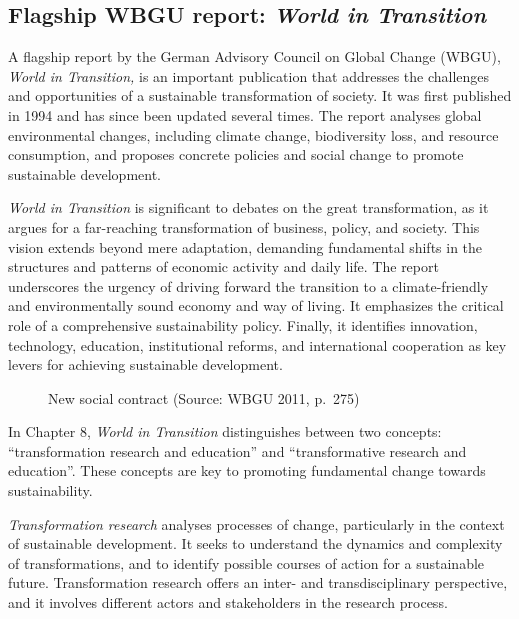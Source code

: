 \documentclass[
  a4paper,
  openany]{book}
\makeatletter
\newcommand*\pandocbounded[1]{%
  \sbox\pandoc@box{#1}%
  \Gscale@div\@tempa{\textheight}{\dimexpr\ht\pandoc@box+\dp\pandoc@box\relax}%
  \Gscale@div\@tempb{\linewidth}{\wd\pandoc@box}%
  \ifdim\@tempb\p@<\@tempa\p@\let\@tempa\@tempb\fi%
  \ifdim\@tempa\p@<\p@\scalebox{\@tempa}{\usebox\pandoc@box}%
  \else\usebox{\pandoc@box}%
  \fi%
}
\makeatother
\begin{document}
\subsection{\texorpdfstring{Flagship WBGU report: \emph{World in
Transition}}{Flagship WBGU report: World in Transition}}\label{flagship-wbgu-report-world-in-transition}

A flagship report by the German Advisory Council on Global Change
(WBGU), \emph{World in Transition,} is an important publication that
addresses the challenges and opportunities of a sustainable
transformation of society. It was first published in 1994 and has since
been updated several times. The report analyses global environmental
changes, including climate change, biodiversity loss, and resource
consumption, and proposes concrete policies and social change to promote
sustainable development.

\emph{World in Transition} is significant to debates on the great
transformation, as it argues for a far-reaching transformation of
business, policy, and society. This vision extends beyond mere
adaptation, demanding fundamental shifts in the structures and patterns
of economic activity and daily life. The report underscores the urgency
of driving forward the transition to a climate-friendly and
environmentally sound economy and way of living. It emphasizes the
critical role of a comprehensive sustainability policy. Finally, it
identifies innovation, technology, education, institutional reforms, and
international cooperation as key levers for achieving sustainable
development.

\begin{figure}[H]

\centering{

\pandocbounded{\texttt{[image: 2\_approaches/Images/.png]}}

}

\caption{\label{fig-new-social-contract}New social contract (Source:
WBGU 2011, p.~275)}

\end{figure}%

In Chapter 8, \emph{World in Transition} distinguishes between two
concepts: ``transformation research and education'' and ``transformative
research and education''. These concepts are key to promoting
fundamental change towards sustainability.

\emph{Transformation research} analyses processes of change,
particularly in the context of sustainable development. It seeks to
understand the dynamics and complexity of transformations, and to
identify possible courses of action for a sustainable future.
Transformation research offers an inter- and transdisciplinary
perspective, and it involves different actors and stakeholders in the
research process.
\end{document}
